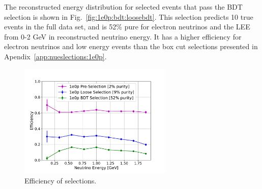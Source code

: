 The reconstructed energy distribution for selected \zpsel events that pass the BDT selection is shown in Fig.~\ref{fig:1e0p:bdt:loosebdt}.  This selection predicts 10 true \zpsel events in the full data set, and is 52\% pure for electron neutrinos and the LEE from 0-2 GeV in reconstructed neutrino energy. 
It has a higher efficiency for electron neutrinos and low energy events than the box cut selections presented in Apendix~\ref{app:nueslections:1e0p}.  







\begin{figure}[H]
\begin{center}
\includegraphics[width=0.65\textwidth]{1e0p/run123_bdt/efficiency08012020.pdf}
\caption{\label{fig:1e0p:eff:RUN3} Efficiency of \zpsel selections.}
\end{center}
\end{figure}

